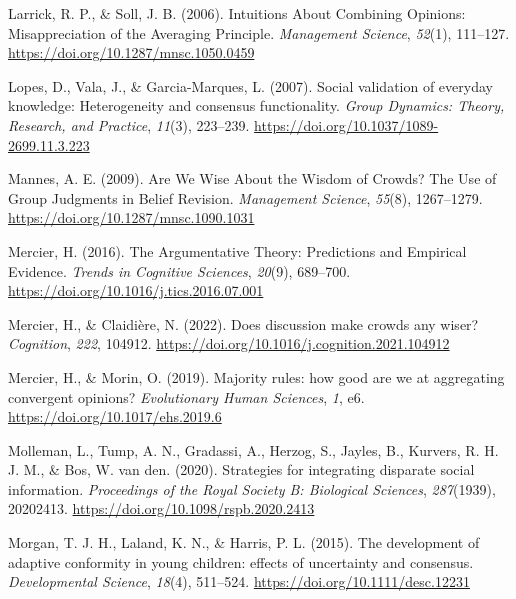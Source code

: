 \documentclass[
  doc,floatsintext]{apa6}
\newlength{\cslhangindent}
\newenvironment{CSLReferences}[2] %
 {\begin{list}{}{%
  \setlength{\itemindent}{0pt}
  \setlength{\leftmargin}{0pt}
  \setlength{\parsep}{0pt}
  \ifodd #1
   \setlength{\leftmargin}{\cslhangindent}
   \setlength{\itemindent}{-1\cslhangindent}
  \fi
  \setlength{\itemsep}{#2\baselineskip}}}
 {\end{list}}
\begin{document}
\begin{CSLReferences}{1}{0}
Larrick, R. P., \& Soll, J. B. (2006). Intuitions About Combining Opinions: Misappreciation of the Averaging Principle. \emph{Management Science}, \emph{52}(1), 111--127. \url{https://doi.org/10.1287/mnsc.1050.0459}

Lopes, D., Vala, J., \& Garcia-Marques, L. (2007). Social validation of everyday knowledge: Heterogeneity and consensus functionality. \emph{Group Dynamics: Theory, Research, and Practice}, \emph{11}(3), 223--239. \url{https://doi.org/10.1037/1089-2699.11.3.223}

Mannes, A. E. (2009). Are We Wise About the Wisdom of Crowds? The Use of Group Judgments in Belief Revision. \emph{Management Science}, \emph{55}(8), 1267--1279. \url{https://doi.org/10.1287/mnsc.1090.1031}

Mercier, H. (2016). The Argumentative Theory: Predictions and Empirical Evidence. \emph{Trends in Cognitive Sciences}, \emph{20}(9), 689--700. \url{https://doi.org/10.1016/j.tics.2016.07.001}

Mercier, H., \& Claidière, N. (2022). Does discussion make crowds any wiser? \emph{Cognition}, \emph{222}, 104912. \url{https://doi.org/10.1016/j.cognition.2021.104912}

Mercier, H., \& Morin, O. (2019). Majority rules: how good are we at aggregating convergent opinions? \emph{Evolutionary Human Sciences}, \emph{1}, e6. \url{https://doi.org/10.1017/ehs.2019.6}

Molleman, L., Tump, A. N., Gradassi, A., Herzog, S., Jayles, B., Kurvers, R. H. J. M., \& Bos, W. van den. (2020). Strategies for integrating disparate social information. \emph{Proceedings of the Royal Society B: Biological Sciences}, \emph{287}(1939), 20202413. \url{https://doi.org/10.1098/rspb.2020.2413}

Morgan, T. J. H., Laland, K. N., \& Harris, P. L. (2015). The development of adaptive conformity in young children: effects of uncertainty and consensus. \emph{Developmental Science}, \emph{18}(4), 511--524. \url{https://doi.org/10.1111/desc.12231}


\end{CSLReferences}
\end{document}
